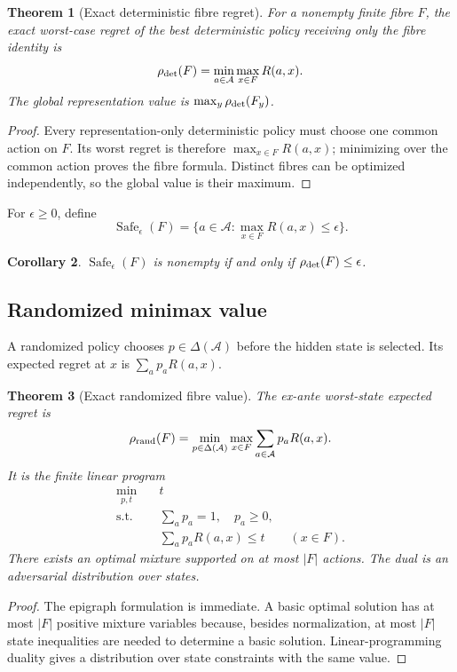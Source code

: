 \documentclass[11pt]{article}
\newtheorem{theorem}{Theorem}
\newtheorem{corollary}[theorem]{Corollary}
\theoremstyle{definition}
\theoremstyle{remark}
\newcommand{\A}{\mathcal A}
\newcommand{\DeltaS}{\Delta}
\begin{document}
\begin{theorem}[Exact deterministic fibre regret]\label{thm:det}
For a nonempty finite fibre $F$, the exact worst-case regret of the best deterministic policy receiving only the fibre identity is
\[
  \rho_{\rm det}(F)=\min_{a\in\A}\max_{x\in F}R(a,x).
\]
The global representation value is $\max_y\rho_{\rm det}(F_y)$.
\end{theorem}
\begin{proof}
Every representation-only deterministic policy must choose one common action on $F$.  Its worst regret is therefore $\max_{x\in F}R(a,x)$; minimizing over the common action proves the fibre formula.  Distinct fibres can be optimized independently, so the global value is their maximum.
\end{proof}

For $\epsilon\ge0$, define
\[
  \operatorname{Safe}_{\epsilon}(F)
  =\{a\in\A:\max_{x\in F}R(a,x)\le\epsilon\}.
\]

\begin{corollary}
$\operatorname{Safe}_{\epsilon}(F)$ is nonempty if and only if $\rho_{\rm det}(F)\le\epsilon$.
\end{corollary}

\subsection{Randomized minimax value}

A randomized policy chooses $p\in\DeltaS(\A)$ before the hidden state is selected.  Its expected regret at $x$ is $\sum_a p_aR(a,x)$.

\begin{theorem}[Exact randomized fibre value]\label{thm:rand}
The ex-ante worst-state expected regret is
\[
 \rho_{\rm rand}(F)
 =\min_{p\in\DeltaS(\A)}\max_{x\in F}\sum_{a\in\A}p_aR(a,x).
\]
It is the finite linear program
\begin{align*}
 \min_{p,t}\quad &t\\
 \text{s.t.}\quad &\sum_a p_a=1,\quad p_a\ge0,\\
 &\sum_a p_aR(a,x)\le t\qquad(x\in F).
\end{align*}
There exists an optimal mixture supported on at most $|F|$ actions.  The dual is an adversarial distribution over states.
\end{theorem}
\begin{proof}
The epigraph formulation is immediate.  A basic optimal solution has at most $|F|$ positive mixture variables because, besides normalization, at most $|F|$ state inequalities are needed to determine a basic solution.  Linear-programming duality gives a distribution over state constraints with the same value.
\end{proof}
\end{document}
